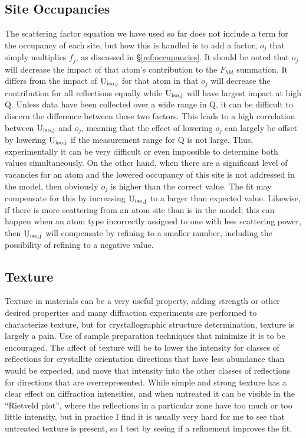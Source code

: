 \subsection{Site Occupancies}
The scattering factor equation we have used so far does not include a term for the occupancy of each site, but how this is handled is to add a factor, $o_j$ that simply multiplies $f_j$, as discussed in \S\ref{ref:occupancies}. It should be noted that $o_j$ will decrease the impact of that atom's contribution to the $F_{hkl}$ summation. It differs from the impact of $\rm U_{iso,j}$ for that atom in that  $o_j$ will decrease the contribution for all reflections equally while $\rm U_{iso,j}$ will have largest impact at high Q. Unless data have been collected over a wide range in Q, it can be difficult to discern the difference between these two factors. This leads to a high correlation between $\rm U_{iso,j}$ and $o_j$, meaning that the effect of lowering $o_j$ can largely be offset by lowering $\rm U_{iso,j}$ if the measurement range for Q is not large. Thus, experimentally it can be very difficult or even impossible to determine both values simultaneously. On the other hand, when there are a significant level of vacancies for an atom and the lowered occupancy of this site is not addressed in the model, then obviously $o_j$ is higher than the correct value. The fit may compensate for this by increasing $\rm U_{iso,j}$ to a larger than expected value. Likewise, if there is more scattering from an atom site than is in the model; this can happen when an atom type incorrectly assigned to one with less scattering power, then $\rm U_{iso,j}$ will compensate by refining to a smaller number, including the possibility of refining to a negative value. 

\subsection{Texture} 
Texture in materials can be a very useful property, adding strength or other desired properties and many diffraction experiments are performed to characterize texture, but for crystallographic structure determination, texture is largely a pain. Use of sample preparation techniques that minimize it is to be encouraged. The affect of texture will be to lower the intensity for classes of reflections for crystallite orientation directions that have less abundance than would be expected, and move that intensity into the other classes of reflections for directions that are overrepresented. While simple and strong texture has a clear effect on diffraction intensities, and when untreated it can be visible in the ``Rietveld plot'', where the reflections in a particular zone have too much or too little intensity, but in practice I find it is usually very hard for me to see that untreated texture is present, so I test by seeing if a refinement improves the fit. 

